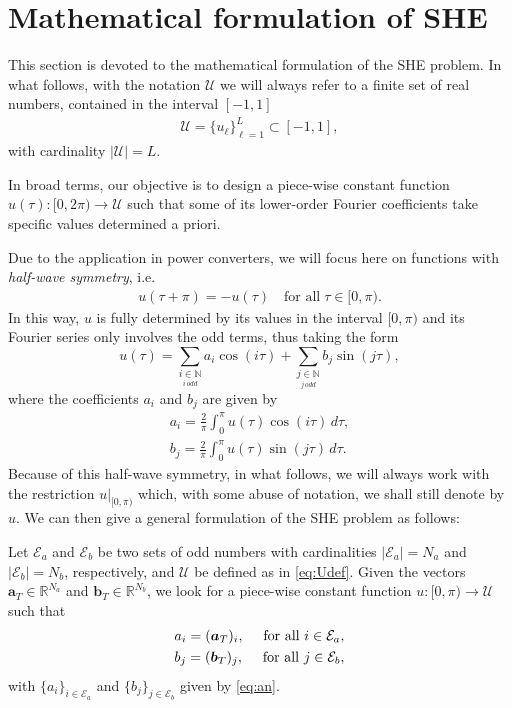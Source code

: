 \section{Mathematical formulation of SHE}\label{Section2}

This section is devoted to the mathematical formulation of the SHE problem. In what follows, with the notation $\mathcal U$ we will always refer to a finite set of real numbers, contained in the interval $[-1,1]$
\begin{align}\label{eq:Udef}
	\mathcal U = \{u_\ell\}_{\ell=1}^L\subset [-1,1],
\end{align}
with cardinality $|\mathcal U| = L$. 

In broad terms, our objective is to design a piece-wise constant function $u(\tau):[0,2\pi)\to\mathcal U$ such that some of its lower-order Fourier coefficients take specific values determined a priori. 

Due to the application in power converters, we will focus here on functions with \textit{half-wave symmetry}, i.e. 
\begin{align*}
	u(\tau + \pi) = -u(\tau)\quad \mbox{for all}\; \tau \in [0,\pi).
\end{align*}
In this way, $u$ is fully determined by its values in the interval $[0,\pi)$ and its Fourier series only involves the odd terms, thus taking the form
\begin{equation}
	u(\tau ) = \sum_{\underset{i\, odd}{i \in \mathbb{N}}} a_i \cos(i\tau)+ \sum_{\underset{j\, odd}{j \in \mathbb{N}}}  b_j \sin(j \tau), 
\end{equation}
where the coefficients $a_i$ and $b_j$ are given by
\begin{equation} \label{eq:an}
	\begin{aligned}
		a_i = \frac{2}{\pi} \int_0^\pi u(\tau ) \cos(i \tau)\,d\tau, 
		\\
		b_j = \frac{2}{\pi} \int_0^\pi u(\tau)  \sin(j \tau)\,d\tau.
	\end{aligned}
\end{equation}
Because of this half-wave symmetry, in what follows, we will always work with the restriction $u|_{[0,\pi)}$ which, with some abuse of notation, we shall still denote by $u$. We can then give a general formulation of the SHE problem as follows:
\newline
\begin{problem}[SHE]\label{SHEp}
Let $\mathcal{E} _a $ and $\mathcal{E} _b $ be two sets of odd numbers with cardinalities $|\mathcal{E}_a| = N_a $ and $ |\mathcal{E} _b| = N_b$, respectively, and $\mathcal{U}$ be defined as in \eqref{eq:Udef}. Given the vectors $\bm{a}_T \in \mathbb{R}^{N_a}$ and $\bm{b}_T \in \mathbb{R}^{N_b} $, we look for a piece-wise constant function $u: [0,\pi)\to\mathcal{U}$ such that 
\begin{gather}
	\notag a_i = (\bm{a}_T)_i, \quad\textrm{ for all } i \in \mathcal{E}_a,
	\\
	\notag b_j = (\bm {b}_T)_j, \quad\textrm{ for all } j \in \mathcal{E}_b,
\end{gather}
with $\{a_i\}_{i\in\mathcal E_a}$ and $\{b_j\}_{j\in\mathcal E_b}$ given by \eqref{eq:an}.
\end{problem} 


